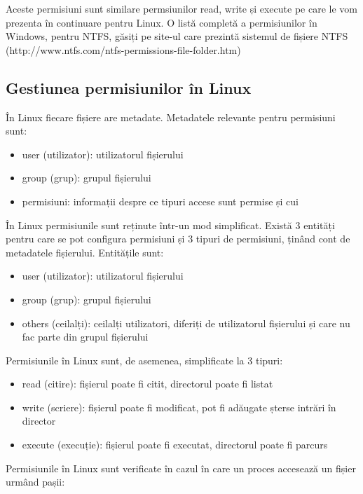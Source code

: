 Aceste permisiuni sunt similare permsiunilor read, write și execute pe care le
vom prezenta în continuare pentru Linux. O listă completă a permisiunilor în
Windows, pentru NTFS, găsiți pe site-ul care prezintă sistemul de fișiere NTFS
(http://www.ntfs.com/ntfs-permissions-file-folder.htm)

\subsection{Gestiunea permisiunilor în Linux}
\label{sec:users-fs-perms-linux}

În Linux fiecare fișiere are metadate. Metadatele relevante pentru permisiuni sunt:

\begin{itemize}
	\item user (utilizator): utilizatorul fișierului
	\item group (grup): grupul fișierului
	\item permisiuni: informații despre ce tipuri accese sunt permise și cui
\end{itemize}

În Linux permisiunile sunt reținute într-un mod simplificat. Există 3 entități
pentru care se pot configura permisiuni și 3 tipuri de permisiuni, ținând cont
de metadatele fișierului. Entitățile sunt:

\begin{itemize}
	\item user (utilizator): utilizatorul fișierului
	\item group (grup): grupul fișierului
	\item others (ceilalți): ceilalți utilizatori, diferiți de utilizatorul
		fișierului și care nu fac parte din grupul fișierului
\end{itemize}

Permisiunile în Linux sunt, de asemenea, simplificate la 3 tipuri:

\begin{itemize}
	\item read (citire): fișierul poate fi citit, directorul poate fi listat
	\item write (scriere): fișierul poate fi modificat, pot fi adăugate
		șterse intrări în director
	\item execute (execuție): fișierul poate fi executat, directorul poate
		fi parcurs
\end{itemize}

Permisiunile în Linux sunt verificate în cazul în care un proces accesează un fișier urmând pașii:

